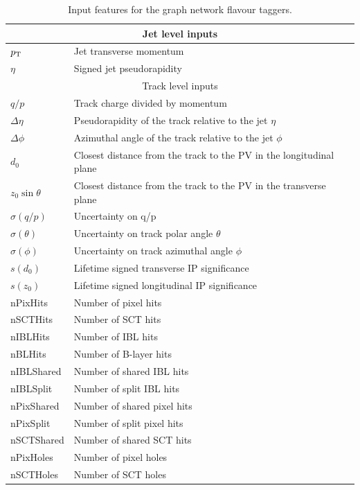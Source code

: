 \begin{table}[h]
    \centering
    \begin{tabular}{ll}
        \toprule
        \midrule
        \multicolumn{2}{c}{Jet level inputs} \\
        \midrule
        $p_{\text{T}}$ & Jet transverse momentum \\
        $\eta$ & Signed jet pseudorapidity \\
        \midrule
        \midrule
        \multicolumn{2}{c}{Track level inputs} \\
        \midrule
        $q/p$ & Track charge divided by momentum \\
        $\Delta\eta$ & Pseudorapidity of the track relative to the jet $\eta$ \\
        $\Delta\phi$ & Azimuthal angle of the track relative to the jet $\phi$ \\
        $d_0$ & Closest distance from the track to the PV in the longitudinal plane \\
        $z_0 \sin \theta$ & Closest distance from the track to the PV in the transverse plane \\
        $\sigma(q/p)$ & Uncertainty on q/p \\
        $\sigma(\theta)$ & Uncertainty on track polar angle $\theta$ \\
        $\sigma(\phi)$ & Uncertainty on track azimuthal angle $\phi$ \\
        $s(d_0)$ & Lifetime signed transverse IP significance \\
        $s(z_0)$ & Lifetime signed longitudinal IP significance \\
        nPixHits & Number of pixel hits \\
        nSCTHits & Number of SCT hits \\
        nIBLHits & Number of IBL hits \\
        nBLHits & Number of B-layer hits \\
        nIBLShared & Number of shared IBL hits \\
        nIBLSplit & Number of split IBL hits \\
        nPixShared & Number of shared pixel hits \\
        nPixSplit & Number of split pixel hits \\
        nSCTShared & Number of shared SCT hits \\
        nPixHoles & Number of pixel holes \\
        nSCTHoles & Number of SCT holes \\
        \bottomrule
    \end{tabular}
    \caption{Input features for the graph network flavour taggers.}
    \label{tab:track_features}
\end{table}

